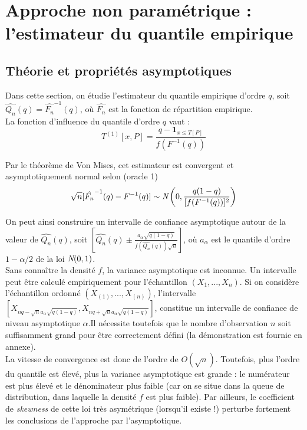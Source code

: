 \documentclass{article}
\renewcommand*{\(}{\left(}
\renewcommand*{\)}{\right)}
\begin{document}
\clearpage
\section{Approche non paramétrique : l'estimateur du quantile empirique}

\subsection{Théorie et propriétés asymptotiques}
Dans cette section, on étudie l'estimateur du quantile empirique d'ordre $q$, soit  $\hat{Q_n}(q)=\hat{F_n}^{-1}(q)$, où $\hat{F_n}$ est la fonction de répartition empirique.\\
La fonction d'influence du quantile d'ordre $q$ vaut :
\[ T^{(1)}[x,P] = \frac{q-\mathbf{1}_{x \leq T[P]} }{ f(F^{-1}(q)) } \]

Par le théorème de Von Mises, cet estimateur est convergent et asymptotiquement normal selon (oracle 1)
\[
\sqrt{n}[\hat{F_n}^{-1}(q)-F^{-1}(q)]\sim \emph{N} \left( 0,\frac{q(1-q)}{[f(F^{-1}(q))]^2} \right)
\]

On peut ainsi construire un intervalle de confiance asymptotique autour de la valeur de $\hat{Q_n}(q)$, soit $[\hat{Q_n}(q) \pm \frac{a_{\alpha}\sqrt{q(1-q)}}{f(\hat{Q_n}(q))\sqrt{n}}]$, où $a_{\alpha}$ est le quantile d'ordre $1-\alpha/2$ de la loi $\emph{N}(0,1)$. \\

Sans connaître la densité $f$, la variance asymptotique est inconnue. Un intervalle peut être calculé empiriquement pour l'échantillon $(X_1, ..., X_n)$. Si on considère l'échantillon ordonné $(X_{(1)}, ..., X_{(n)})$, l'intervalle $[X_{nq-\sqrt{n}a_\alpha\sqrt{q(1-q)}},X_{nq+\sqrt{n}a_\alpha\sqrt{q(1-q)}}]$, constitue un intervalle de confiance de niveau asymptotique $\alpha$.Il nécessite toutefois que le nombre d'observation $n$ soit suffisamment grand pour être correctement défini (la démonstration est fournie en annexe).\\

La vitesse de convergence est donc de l'ordre de $O(\sqrt{n})$.
Toutefois, plus l'ordre du quantile est élevé, plus la variance asymptotique est grande : le numérateur est plus élevé et le dénominateur plus faible (car on se situe dans la queue de distribution, dans laquelle la densité $f$ est plus faible). Par ailleurs, le coefficient de \textit{skewness} de cette loi très asymétrique (lorsqu'il existe !) perturbe fortement les conclusions de l'approche par l'asymptotique.\\
\end{document}
